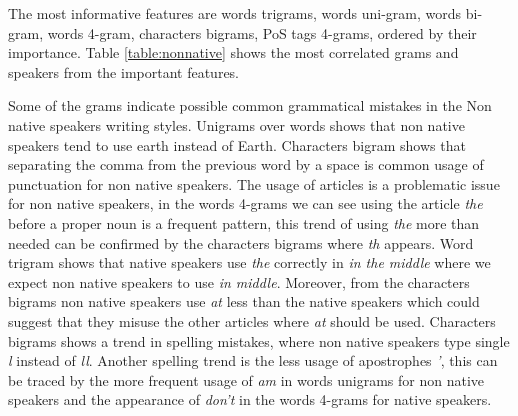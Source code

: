 \documentclass[11pt]{article}
\begin{document}
The most informative features are words trigrams, words uni-gram, words bi-gram, words 4-gram, characters bigrams, PoS tags 4-grams, ordered by their importance. Table \ref{table:nonnative} shows the most correlated grams and speakers from the important features.

Some of the grams indicate possible common grammatical mistakes in the Non native speakers writing styles. Unigrams over words shows that non native speakers tend to use earth instead of Earth. Characters bigram shows that separating the comma from the previous word by a space is common usage of punctuation for non native speakers.
The usage of articles is a problematic issue for non native speakers, in the words 4-grams we can see using the article \emph{the} before a proper noun is a frequent pattern, this trend of using \emph{the} more than needed can be confirmed by the characters bigrams where \emph{th} appears. Word trigram shows that native speakers use \emph{the} correctly in \emph{in the middle} where we expect non native speakers to use \emph{in middle}.
Moreover, from the characters bigrams non native speakers use \emph{at} less than the native speakers which could suggest that they misuse the other articles where \emph{at} should be used. Characters bigrams shows a trend in spelling mistakes, where non native speakers type single \emph{l} instead of \emph{ll}. Another spelling trend is the less usage of apostrophes \emph{'}, this can be traced by the more frequent usage of \emph{am} in words unigrams for non native speakers and the appearance of \emph{don't} in the words 4-grams for native speakers.
\end{document}
